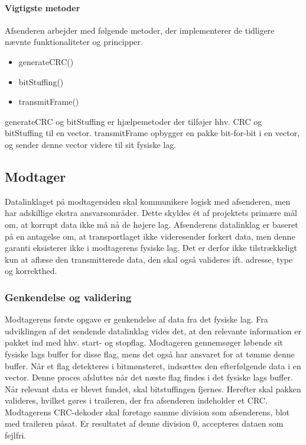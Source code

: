 \paragraph{Vigtigste metoder}\hfill \break
Afsenderen arbejder med følgende metoder, der implementerer de tidligere nævnte funktionaliteter og principper.
\begin{itemize}[noitemsep]
  \item generateCRC()
  \item bitStuffing()
  \item transmitFrame()
  \end{itemize}
generateCRC og bitStuffing er hjælpemetoder der tilføjer hhv. CRC og bitStuffing til en vector.
transmitFrame opbygger en pakke bit-for-bit i en vector, og sender denne vector videre til sit fysiske lag.

\subsection{Modtager}
Datalinklaget på modtagersiden skal kommunikere logisk med afsenderen, men har adskillige ekstra ansvarsområder. Dette skyldes ét af projektets primære mål om, at korrupt data ikke må nå de højere lag. Afsenderens datalinklag er baseret på en antagelse om, at transportlaget ikke videresender forkert data, men denne garanti eksisterer ikke i modtagerens fysiske lag. Det er derfor ikke tilstrækkeligt kun at aflæse den transmitterede data, den skal også valideres ift. adresse, type og korrekthed.

\subsubsection{Genkendelse og validering}
Modtagerens første opgave er genkendelse af data fra det fysiske lag. Fra udviklingen af det sendende datalinklag vides det, at den relevante information er pakket ind med hhv. start- og stopflag. Modtageren gennemsøger løbende sit fysiske lags buffer for disse flag, mens det også har ansvaret for at tømme denne buffer. Når et flag detekteres i bitmønsteret, indsættes den efterfølgende data i en vector. Denne proces afsluttes når det næste flag findes i det fysiske lags buffer.
    Når relevant data er blevet fundet, skal bitstuffingen fjernes. Herefter skal pakken valideres, hvilket gøres i traileren, der fra afsenderen indeholder et CRC. Modtagerens CRC-dekoder skal foretage samme division som afsenderens, blot med traileren påsat. Er resultatet af denne division 0, accepteres dataen som fejlfri.
    
